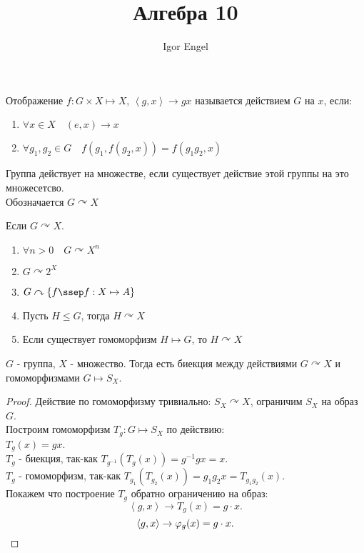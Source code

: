 \documentclass[11pt, oneside]{article}   	%
\title{Алгебра 10}
\author{Igor Engel}
\date{}
\newcommand{\actson}{\curvearrowright}
\begin{document}
\maketitle
\section{} 
    \begin{definition}
        Отображение $f : G \times X \mapsto X$, $\left<g, x\right> \to gx$ называется действием $G$ на $x$, если:
        \begin{enumerate}
            \item $\forall{x\in X}\quad (e, x) \to x$
            \item $\forall{g_1, g_2\in G}\quad f(g_1, f(g_2, x)) = f(g_1g_2, x)$
        \end{enumerate}
    \end{definition}
    \begin{definition}
        Группа действует на множестве, если существует действие этой группы на это множесетсво.\\
        Обозначается $G\actson X$
    \end{definition}
    \begin{dlemma}
        Если $G\actson X$.
        \begin{enumerate}
            \item $\forall{n > 0}\quad G\actson X^{n}$
            \item $G\actson 2^{X}$
            \item $G\actson \{f \ssep f : X \mapsto A\} $
            \item Пусть $H \le G$, тогда $H\actson X$
            \item Если существует гомоморфизм $H \mapsto G$, то $H\actson X$
        \end{enumerate}
    \end{dlemma}
    \begin{theorem}
        $G$ -  группа, $X$ - множество. Тогда есть биекция между действиями $G\actson X$ и гомоморфизмами $G \mapsto S_{X}$.
        \begin{proof}
            Действие по гомоморфизму тривиально: $S_{X}\actson X$, ограничим $S_{X}$ на образ $G$.\\
            Построим гомоморфизм $T_{g} : G \mapsto S_{X}$ по действию:\\
            $T_g(x) = gx$.\\
            $T_g$ -  биекция, так-как $T_{g^{-1}}\left( T_{g}(x) \right) = g^{-1}gx=x $.\\
            $T_g$ -  гомоморфизм, так-как $T_{g_1}\left( T_{g_2}(x) \right) = g_1g_2x = T_{g_1g_2}(x)$.\\
            Покажем что построение $T_g$ обратно ограничению на образ:\\
            \[ \left<g, x\right> \to T_{g}(x) = g\cdot x .\]
            \[ \left<g, x\right> \to \varphi_{g}(x) = g\cdot x .\qedhere\] 
        \end{proof}
    \end{theorem}
\end{document}
